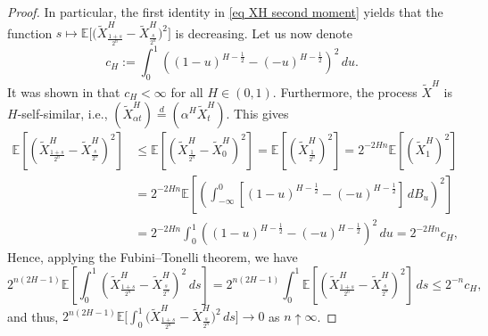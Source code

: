 \documentclass[12pt,reqno]{article}
\def\ua{\uparrow}
\def\wt{\widetilde}
\numberwithin{equation}{section}
\theoremstyle{definition}
\def\wt#1{\widetilde{#1}}
\def\ua{\uparrow}
\def\wt{\widetilde}
\newcommand{\bE}{\mathbb{E}}
\begin{document}
\begin{proof}
	In particular, the first identity in \eqref{eq XH second moment} yields that the function $s \mapsto \bE\big[\big(\wt X^H_{\frac{1+s}{2^n}} - \wt X^H_\frac{s}{2^n}\big)^2\big]$ is decreasing. Let us now denote 
	\begin{equation*}
		c_H := \int_0^{1}\left((1-u)^{H-\frac{1}{2}} - (-u)^{H-\frac{1}{2}}\right)^2\,du.
	\end{equation*}
	It was shown in \cite[Proposition 2.3]{Nourdin2012} that $c_H < \infty$ for all $H \in (0,1)$. Furthermore, the process $\wt X^H$ is $H$-self-similar, i.e., $(\wt X^H_{\alpha t}) \overset{d}{=} (\alpha^{H} \wt X^H_t)$. This gives 
	\begin{equation*}
		\begin{split}
			\bE\left[\left(\wt X^H_{\frac{1+s}{2^n}} - \wt  X^H_\frac{s}{2^n}\right)^2\right]  &\le \bE\left[\left(\wt X^H_{\frac{1}{2^n}} - \wt X^H_0\right)^2\right] = \bE\left[\left(\wt X^H_{\frac{1}{2^n}}\right)^2\right] = 2^{-2Hn}\bE\left[\left(\wt X^H_1\right)^2\right]\\&= 2^{-2Hn}\bE\left[\left(\int_{-\infty}^{0}\left[(1-u)^{H-\frac{1}{2}} - (-u)^{H-\frac{1}{2}}\right]\,dB_u\right)^2\right]\\&= 2^{-2Hn} \int_0^{1}\left((1-u)^{H-\frac{1}{2}} - (-u)^{H-\frac{1}{2}}\right)^2\,du = 2^{-2Hn}c_H,
		\end{split}
	\end{equation*}
	Hence, applying the Fubini--Tonelli theorem, we have 
	\begin{equation*}
		2^{n(2H-1)}\bE\left[\int_0^1\left(\wt X^H_{\frac{1+s}{2^n}} - \wt X^H_\frac{s}{2^n}\right)^2\,ds\right] = 2^{n(2H-1)}\int_{0}^{1}\bE\left[\left(\wt X^H_{\frac{1+s}{2^n}} - \wt X^H_\frac{s}{2^n}\right)^2\right]\,ds \le 2^{-n}c_H,
	\end{equation*}
	and thus, $2^{n(2H-1)}\bE\big[\int_0^1\big(\wt X^H_{\frac{1+s}{2^n}} - \wt X^H_\frac{s}{2^n}\big)^2\,ds\big] \rightarrow 0$ as $n \ua \infty$. 
	

\end{proof}
\end{document}
